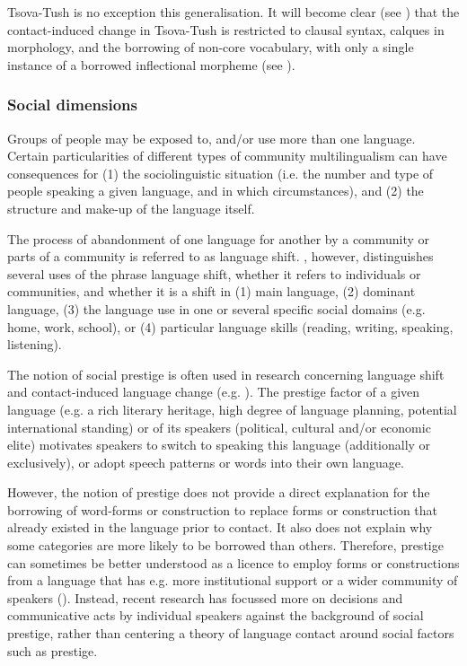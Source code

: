 Tsova-Tush is no exception this generalisation. It will become clear (see ) that the contact-induced change in Tsova-Tush is restricted to clausal syntax, calques in morphology, and the borrowing of non-core vocabulary, with only a single instance of a borrowed inflectional morpheme (see ).


\subsubsection{Social dimensions}

Groups of people may be exposed to, and/or use more than one language. Certain particularities of different types of community multilingualism can have consequences for (1) the sociolinguistic situation (i.e. the number and type of people speaking a given language, and in which circumstances), and (2) the structure and make-up of the language itself.

The process of abandonment of one language for another by a community or parts of a community is referred to as language shift. \textcite[20]{clyne2003contact}, however, distinguishes several uses of the phrase language shift, whether it refers to individuals or communities, and whether it is a shift in (1) main language, (2) dominant language, (3) the language use in one or several specific social domains (e.g. home, work, school), or (4) particular language skills (reading, writing, speaking, listening). 

The notion of social prestige is often used in research concerning language shift and contact-induced language change (e.g. \cite{haugen1966dialect}). The prestige factor of a given language (e.g. a rich literary heritage, high degree of language planning, potential international standing) or of its speakers (political, cultural and/or economic elite) motivates speakers to switch to speaking this language (additionally or exclusively), or adopt speech patterns or words into their own language. 

However, the notion of prestige does not provide a direct explanation for the borrowing of word-forms or construction to replace forms or construction that already existed in the language prior to contact. It also does not explain why some categories are more likely to be borrowed than others. Therefore, prestige can sometimes be better understood as a licence to employ forms or constructions from a language that has e.g.  more institutional support or a wider community of speakers (\cite[19]{matras2012activity}). Instead, recent research has focussed more on decisions and communicative acts by individual speakers against the background of social prestige, rather than centering a theory of language contact around social factors such as prestige.

